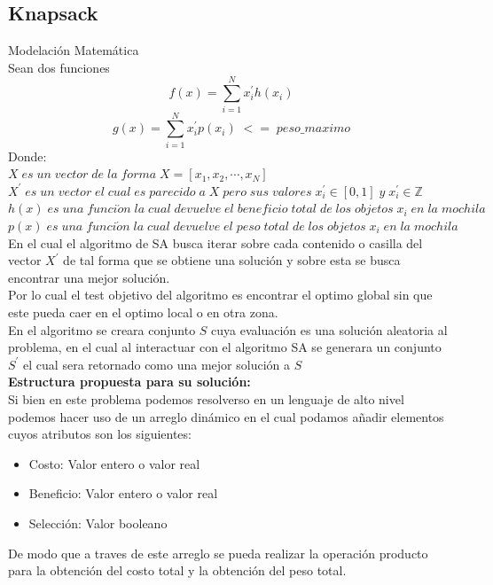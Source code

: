 \documentclass[10pt]{article}
\begin{document}
\subsection{Knapsack}
Modelación Matemática\\
Sean dos funciones
\[f(x)=\sum_{i=1}^{N}x^{'}_{i}h(x_{i})\]
\[g(x)=\sum_{i=1}^{N}x^{'}_{i}p(x_{i})\;<=\;peso\_maximo\]
Donde:\\
\(\displaystyle X\;es\;un\;vector\;de\;la\;forma\;X=[x_{1},x_{2},\cdots,x_{N}]\)\\\vspace{0.25cm}
\(\displaystyle X^{'}\;es\;un\;vector\;el\;cual\;es\;parecido\;a\;X\;pero\;sus\;valores\;x_{i}^{'}\in[0,1]\;y\;x_{i}^{'}\in\mathbb{Z}\)\\\vspace{0.25cm}
\(\displaystyle h(x)\;es\;una\;funci\acute{o}n\;la\;cual\;devuelve\;el\;beneficio\;total\;de\;los\;objetos\;x_{i}\;en\;la\;mochila\)\\\vspace{0.25cm}
\(\displaystyle p(x)\;es\;una\;funci\acute{o}n\;la\;cual\;devuelve\;el\;peso\;total\;de\;los\;objetos\;x_{i}\;en\;la\;mochila\)\\\vspace{0.25cm}
En el cual el algoritmo de SA busca iterar sobre cada contenido o casilla del vector $X^{'}$ de tal forma que se obtiene una solución y sobre esta se busca encontrar una mejor solución.\\
Por lo cual el test objetivo del algoritmo es encontrar el optimo global sin que este pueda caer en el optimo local o en otra zona.\\
En el algoritmo se creara conjunto $S$ cuya evaluación es una solución aleatoria al problema, en el cual al interactuar con el algoritmo SA se generara un conjunto $S^{'}$ el cual sera retornado como una mejor solución a $S$\\\vspace{0.5cm}
\textbf{Estructura propuesta para su solución:}\\
Si bien en este problema podemos resolverso en un lenguaje de alto nivel podemos hacer uso de un arreglo dinámico en el cual podamos añadir elementos cuyos atributos son los siguientes:\\
\begin{itemize}
  \item Costo: Valor entero o valor real
  \item Beneficio: Valor entero o valor real
  \item Selección: Valor booleano
\end{itemize}
De modo que a traves de este arreglo se pueda realizar la operación producto para la obtención del costo total y la obtención del peso total.
\end{document}
